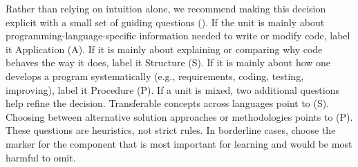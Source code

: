 \documentclass{article}
\begin{document}
Rather than relying on intuition alone, we recommend making this decision explicit with a small set of guiding questions ().
If the unit is mainly about programming-language-specific information needed to write or modify code, label it Application (A). If it is mainly about explaining or comparing why code behaves the way it does, label it Structure (S). If it is mainly about how one develops a program systematically (e.g., requirements, coding, testing, improving), label it Procedure (P).
If a unit is mixed, two additional questions help refine the decision. Transferable concepts across languages point to (S). Choosing between alternative solution approaches or methodologies points to (P). These questions are heuristics, not strict rules. In borderline cases, choose the marker for the component that is most important for learning and would be most harmful to omit.
\end{document}
